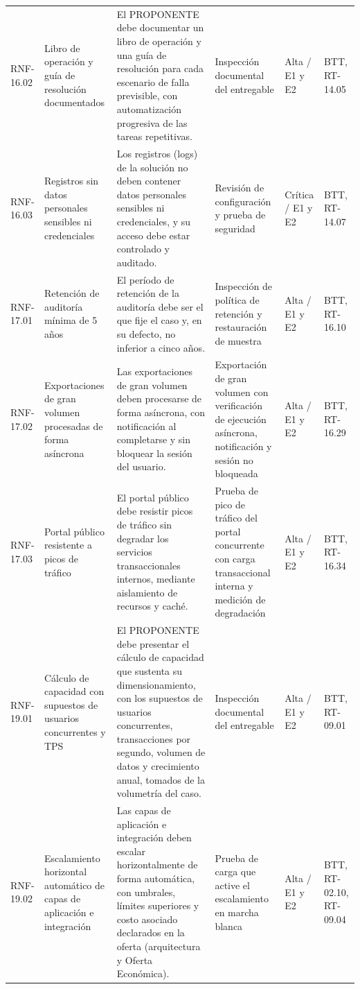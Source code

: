 {\begin{longtable}{@{}F{0.091} F{0.172} F{0.381} F{0.144} F{0.121} F{0.091}@{}}
  RNF-16.02 & Libro de operación y guía de resolución documentados & El PROPONENTE debe documentar un libro de operación y una guía de resolución para cada escenario de falla previsible, con automatización progresiva de las tareas repetitivas. & Inspección documental del entregable & Alta / E1 y E2 & BTT, RT-14.05 \\
  RNF-16.03 & Registros sin datos personales sensibles ni credenciales & Los registros (logs) de la solución no deben contener datos personales sensibles ni credenciales, y su acceso debe estar controlado y auditado. & Revisión de configuración y prueba de seguridad & Crítica / E1 y E2 & BTT, RT-14.07 \\
  RNF-17.01 & Retención de auditoría mínima de 5 años & El período de retención de la auditoría debe ser el que fije el caso y, en su defecto, no inferior a cinco años. & Inspección de política de retención y restauración de muestra & Alta / E1 y E2 & BTT, RT-16.10 \\
  RNF-17.02 & Exportaciones de gran volumen procesadas de forma asíncrona & Las exportaciones de gran volumen deben procesarse de forma asíncrona, con notificación al completarse y sin bloquear la sesión del usuario. & Exportación de gran volumen con verificación de ejecución asíncrona, notificación y sesión no bloqueada & Alta / E1 y E2 & BTT, RT-16.29 \\
  RNF-17.03 & Portal público resistente a picos de tráfico & El portal público debe resistir picos de tráfico sin degradar los servicios transaccionales internos, mediante aislamiento de recursos y caché. & Prueba de pico de tráfico del portal concurrente con carga transaccional interna y medición de degradación & Alta / E1 y E2 & BTT, RT-16.34 \\
  RNF-19.01 & Cálculo de capacidad con supuestos de usuarios concurrentes y TPS & El PROPONENTE debe presentar el cálculo de capacidad que sustenta su dimensionamiento, con los supuestos de usuarios concurrentes, transacciones por segundo, volumen de datos y crecimiento anual, tomados de la volumetría del caso. & Inspección documental del entregable & Alta / E1 y E2 & BTT, RT-09.01 \\
  RNF-19.02 & Escalamiento horizontal automático de capas de aplicación e integración & Las capas de aplicación e integración deben escalar horizontalmente de forma automática, con umbrales, límites superiores y costo asociado declarados en la oferta (arquitectura y Oferta Económica). & Prueba de carga que active el escalamiento en marcha blanca & Alta / E1 y E2 & BTT, RT-02.10, RT-09.04 \\

\end{longtable}}
